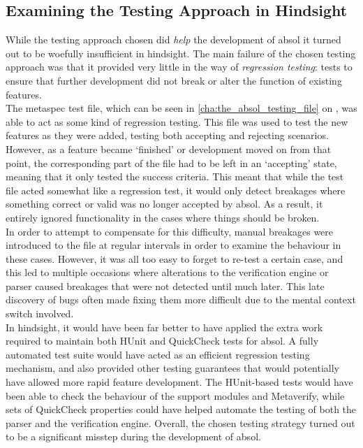\subsection{Examining the Testing Approach in Hindsight} %
\label{sub:examining_the_testing_approach_in_hindsight}
While the testing approach chosen did \textit{help} the development of \gls{absol} it turned out to be woefully insufficient in hindsight.
The main failure of the chosen testing approach was that it provided very little in the way of \textit{regression testing}: tests to ensure that further development did not break or alter the function of existing features. \\

The \gls{metaspec} test file, which can be seen in \autoref{cha:the_absol_testing_file} on , was able to act as some kind of regression testing.
This file was used to test the new features as they were added, testing both accepting and rejecting scenarios.
However, as a feature became `finished' or development moved on from that point, the corresponding part of the file had to be left in an `accepting' state, meaning that it only tested the success criteria.
This meant that while the test file acted somewhat like a regression test, it would only detect breakages where something correct or valid was no longer accepted by \gls{absol}.
As a result, it entirely ignored functionality in the cases where things should be broken.\\

In order to attempt to compensate for this difficulty, manual breakages were introduced to the file at regular intervals in order to examine the behaviour in these cases. 
However, it was all too easy to forget to re-test a certain case, and this led to multiple occasions where alterations to the verification engine or parser caused breakages that were not detected until much later.
This late discovery of bugs often made fixing them more difficult due to the mental context switch involved. \\

In hindsight, it would have been far better to have applied the extra work required to maintain both HUnit and QuickCheck tests for \gls{absol}.
A fully automated test suite would have acted as an efficient regression testing mechanism, and also provided other testing guarantees that would potentially have allowed more rapid feature development. 
The HUnit-based tests would have been able to check the behaviour of the support modules and Metaverify, while sets of QuickCheck properties could have helped automate the testing of both the parser and the verification engine.
Overall, the chosen testing strategy turned out to be a significant misstep during the development of \gls{absol}.

